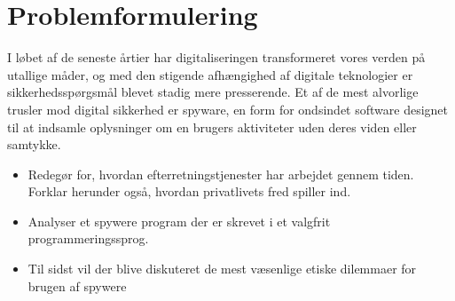 \section{Problemformulering}\label{sec:Problemformulering}
I løbet af de seneste årtier har digitaliseringen transformeret vores verden på utallige måder, og med den stigende afhængighed af digitale teknologier er sikkerhedsspørgsmål blevet stadig mere presserende. Et af de mest alvorlige trusler mod digital sikkerhed er spyware, en form for ondsindet software designet til at indsamle oplysninger om en brugers aktiviteter uden deres viden eller samtykke. 
\begin{itemize}
    \item Redegør for, hvordan efterretningstjenester har arbejdet gennem tiden. Forklar herunder også, hvordan privatlivets fred spiller ind. %
    \item Analyser et spywere program der er skrevet i et valgfrit programmeringssprog.
    
    \item Til sidst vil der blive diskuteret de mest væsenlige etiske dilemmaer for brugen af spywere
\end{itemize}
\newpage